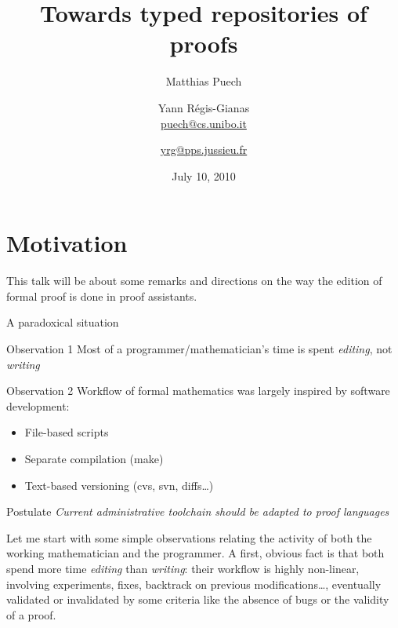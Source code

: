 \documentclass[ignorenonframetext,red]{beamer}
\title{Towards typed repositories of proofs}
\date{July 10, 2010}
\author[Matthias Puech \& Yann Régis-Gianas] {
Matthias Puech\inst{1} \and Yann Régis-Gianas\inst{2} \\
{\small \url{puech@cs.unibo.it}} \and {\small \url{yrg@pps.jussieu.fr}}
}
\institute {
  \inst 1 {\small Dept. of Computer Science, University of Bologna} \and
  \inst 2 {\small University Paris 7, CNRS, and INRIA, PPS, team ${\pi}r^2$}
}
\begin{document}
\begin{frame}
  \titlepage
\end{frame}

\section{Motivation}

This talk will be about some remarks and directions on the way the
edition of formal proof is done in proof assistants.

\begin{frame}{A paradoxical situation}
  \begin{block}{Observation 1}
    Most of a programmer/mathematician's time is spent \emph{editing}, not \emph{writing}
  \end{block}
  \begin{block}{Observation 2}
    Workflow of formal mathematics was largely inspired by software
    development:
    \begin{itemize}
    \item File-based scripts
    \item Separate compilation (\textsf{make})
    \item Text-based versioning (\textsf{cvs}, \textsf{svn},
      \textsf{diff}s\ldots)
    \end{itemize}
  \end{block}
  \begin{block}{Postulate}
    \it Current administrative toolchain should be adapted to proof languages
  \end{block}
  {\Large }
\end{frame}

Let me start with some simple observations relating the activity of
both the working mathematician and the programmer. A first, obvious
fact is that both spend more time \emph{editing} than \emph{writing}:
their workflow is highly non-linear, involving experiments, fixes,
backtrack on previous modifications\ldots, eventually validated or
invalidated by some criteria like the absence of bugs or the validity
of a proof.
\end{document}
